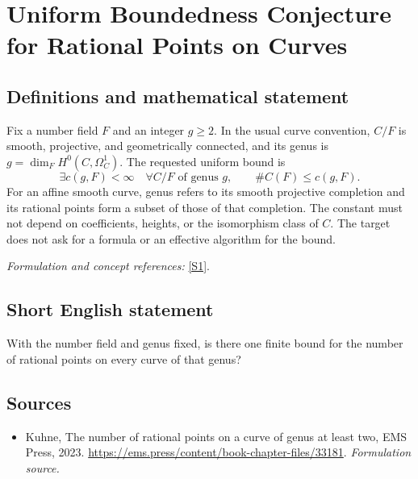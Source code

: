 \documentclass[11pt]{article}
\begin{document}
\section*{\texorpdfstring{Uniform Boundedness Conjecture for Rational Points on Curves}{Uniform Boundedness Conjecture for Rational Points on Curves}}\label{statement}
\subsection{Definitions and mathematical statement}
Fix a number field $F$ and an integer $g\ge2$. In the usual curve convention, $C/F$ is smooth, projective, and geometrically connected, and its genus is $g=\dim_F H^0(C,\Omega_C^1)$. The requested uniform bound is
\[
 \exists c(g,F)<\infty\quad\forall C/F\text{ of genus }g,
 \qquad\#C(F)\le c(g,F).
\]
For an affine smooth curve, genus refers to its smooth projective completion and its rational points form a subset of those of that completion. The constant must not depend on coefficients, heights, or the isomorphism class of $C$. The target does not ask for a formula or an effective algorithm for the bound.
\par\smallskip\textit{Formulation and concept references:} \href{https://ems.press/content/book-chapter-files/33181}{[S1]}.

\subsection{Short English statement}
With the number field and genus fixed, is there one finite bound for the number of rational points on every curve of that genus?
\subsection{Sources}
\begin{itemize}
\item[S1]Kuhne, The number of rational points on a curve of genus at least two, EMS Press, 2023.
\url{https://ems.press/content/book-chapter-files/33181}.
\textit{Formulation source.}
\end{itemize}
\end{document}
